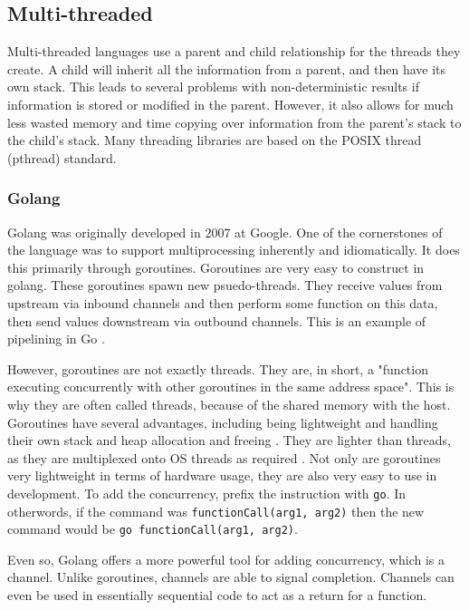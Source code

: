 \documentclass[12pt]{article}
\newcommand{\code}[1]{\lstinline[]{#1}}
\begin{document}
\subsection{Multi-threaded}

Multi-threaded languages use a parent and child relationship for the threads they create. A child will inherit all the information from a parent, and then have its own stack. This leads to several problems with non-deterministic results if information is stored or modified in the parent. However, it also allows for much less wasted memory and time copying over information from the parent's stack to the child's stack. Many threading libraries are based on the POSIX thread (pthread) standard. 

\subsubsection{Golang}

Golang was originally developed in 2007 at Google. One of the cornerstones of the language was to support multiprocessing inherently and idiomatically. It does this primarily through goroutines. Goroutines are very easy to construct in golang. These goroutines spawn new psuedo-threads. They receive values from upstream via inbound channels and then perform some function on this data, then send values downstream via outbound channels. This is an example of pipelining in Go \cite{effective_go}.

However, goroutines are not exactly threads. They are, in short, a "function executing concurrently with other goroutines in the same address space". This is why they are often called threads, because of the shared memory with the host. Goroutines have several advantages, including being lightweight and handling their own stack and heap allocation and freeing \cite{effective_go}. They are lighter than threads, as they are multiplexed onto OS threads as required \cite{conc_not_par}.
Not only are goroutines very lightweight in terms of hardware usage, they are also very easy to use in development. To add the concurrency, prefix the instruction with \code{go}. In otherwords, if the command was \code{functionCall(arg1, arg2)} then the new command would be \code{go functionCall(arg1, arg2)}.

Even so, Golang offers a more powerful tool for adding concurrency, which is a channel. Unlike goroutines, channels are able to signal completion. Channels can even be used in essentially sequential code to act as a return for a function. 
\end{document}
